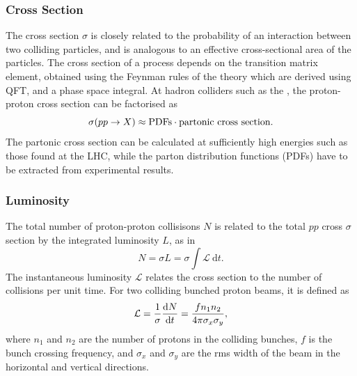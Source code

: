 \subsubsection{Cross Section}
The cross section $\sigma$ is closely related to the probability of an interaction between two colliding particles, and is analogous to an effective cross-sectional area of the particles.
The cross section of a process depends on the transition matrix element, obtained using the Feynman rules of the theory which are derived using QFT, and a phase space integral.
At hadron colliders such as the \LHC, the proton-proton cross section can be factorised as 
%
\begin{equation}
  \sigma(pp \to X) \approx \textnormal{PDFs} \cdot \textnormal{partonic cross section} .
\end{equation}
%
The partonic cross section can be calculated at sufficiently high energies such as those found at the LHC, while the parton distribution functions (PDFs) have to be extracted from experimental results. 

\subsubsection{Luminosity}
The total number of proton-proton collisisons $N$ is related to the total $pp$ cross $\sigma$ section by the integrated luminosity $L$, as in
%
\begin{equation}
  N = \sigma L = \sigma \int \mathcal{L} ~\mathrm{d}t .
\end{equation}
%
The instantaneous luminosity $\mathcal{L}$ relates the cross section to the number of collisions per unit time.
For two colliding bunched proton beams, it is defined as
%
\begin{equation}\label{eq:lumi_def}
  \mathcal{L} = \frac{1}{\sigma} \der{N}{t} = \frac{f n_1 n_2}{4 \pi \sigma_x \sigma_y},
\end{equation}
%
where $n_1$ and $n_2$ are the number of protons in the colliding bunches, $f$ is the bunch crossing frequency, and $\sigma_x$ and $\sigma_y$ are the rms width of the beam in the horizontal and vertical directions.

